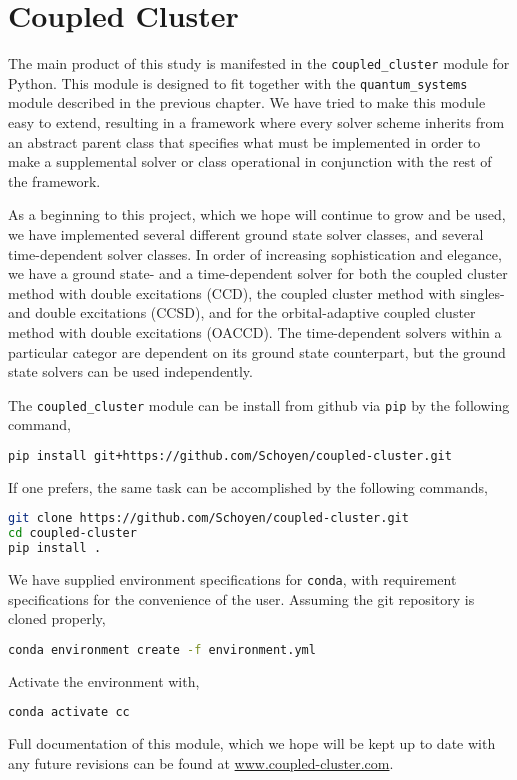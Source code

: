 \chapter{Coupled Cluster}

The main product of this study is manifested in the \lstinline{coupled_cluster}
module for Python. This module is designed to fit together with the
\lstinline{quantum_systems} module described in the previous chapter. We have tried to 
make this module easy to extend, resulting in a framework where every solver scheme 
inherits from an abstract parent class that specifies what must be implemented in order 
to make a supplemental solver or class operational in conjunction with the rest of the 
framework.

As a beginning to this project, which we hope will continue to grow and be used, 
we have implemented several different ground state solver classes, and several
time-dependent solver classes. In order of increasing sophistication and 
elegance, we have a ground state- and a time-dependent solver for both the coupled cluster
method
with double excitations (CCD), the coupled cluster method with singles- and double 
excitations (CCSD), and for the orbital-adaptive coupled cluster method with double
excitations (OACCD). The time-dependent solvers within a particular categor are 
dependent on its ground state counterpart, but the ground state solvers can be used
independently.

The \lstinline{coupled_cluster} module can be install from github via \lstinline{pip}
by the following command,
\begin{lstlisting}[language=bash]
pip install git+https://github.com/Schoyen/coupled-cluster.git
\end{lstlisting}
If one prefers, the same task can be accomplished by the following commands,
\begin{lstlisting}[language=bash]
git clone https://github.com/Schoyen/coupled-cluster.git
cd coupled-cluster
pip install .
\end{lstlisting}
We have supplied environment specifications for \lstinline{conda}, with requirement 
specifications for the convenience of the user. Assuming the git repository is cloned 
properly,
\begin{lstlisting}[language=bash]
conda environment create -f environment.yml
\end{lstlisting}
Activate the environment with,
\begin{lstlisting}[language=bash]
conda activate cc
\end{lstlisting}
Full documentation of this module, which we hope will be kept up to date with any future revisions 
can be found at \url{www.coupled-cluster.com}.


